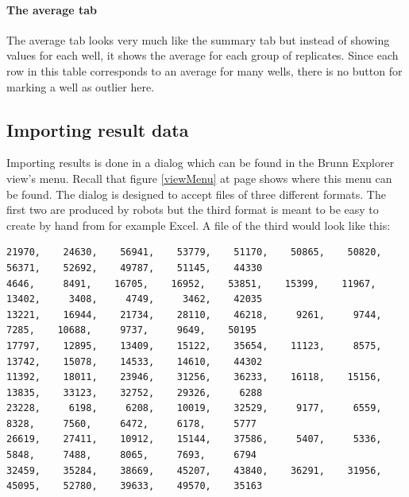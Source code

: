 \documentclass[a4paper,10pt]{article}
\begin{document}
                \paragraph{The average tab}
                    The average tab looks very much like the summary tab but
                    instead of showing values for each well, it shows the
                    average for each group of replicates. Since each row in
                    this table corresponds to an average for many wells, there
                    is no button for marking a well as outlier here.

        \subsection{Importing result data}
        \label{importingResult}
            Importing results is done in a dialog which can be found in the
            Brunn Explorer view's menu. Recall that figure \ref{viewMenu} at
            page \pageref{viewMenu} shows where this menu can be found. The
            dialog is designed to accept files of three different formats. The
            first two are produced by robots but the third format is meant to
            be easy to create by hand from for example Excel. A file of the
            third would look like this:
\tiny
\begin{center}\begin{minipage}{0.88\textwidth}
\begin{verbatim}
21970,    24630,    56941,    53779,    51170,    50865,    50820,    56371,    52692,    49787,    51145,    44330
4646,     8491,    16705,    16952,    53851,    15399,    11967,    13402,     3408,     4749,     3462,    42035
13221,    16944,    21734,    28110,    46218,     9261,     9744,     7285,    10688,     9737,     9649,    50195
17797,    12895,    13409,    15122,    35654,    11123,     8575,    13742,    15078,    14533,    14610,    44302
11392,    18011,    23946,    31256,    36233,    16118,    15156,    13835,    33123,    32752,    29326,     6288
23228,     6198,     6208,    10019,    32529,     9177,     6559,     8328,     7560,     6472,     6178,     5777
26619,    27411,    10912,    15144,    37586,     5407,     5336,     5848,     7488,     8065,     7693,     6794
32459,    35284,    38669,    45207,    43840,    36291,    31956,    45095,    52780,    39633,    49570,    35163
\end{verbatim}            
\end{minipage}\end{center}
\normalsize
\end{document}
